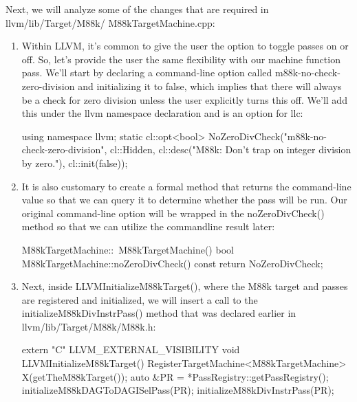 
Next, we will analyze some of the changes that are required in llvm/lib/Target/M88k/ M88kTargetMachine.cpp:

\begin{enumerate}
\item
Within LLVM, it’s common to give the user the option to toggle passes on or off. So, let’s provide the user the same flexibility with our machine function pass. We’ll start by declaring a command-line option called m88k-no-check-zero-division and initializing it to false, which implies that there will always be a check for zero division unless the user explicitly turns this off. We’ll add this under the llvm namespace declaration and is an option for llc:

\begin{cpp}
using namespace llvm;
static cl::opt<bool>
    NoZeroDivCheck("m88k-no-check-zero-division", cl::Hidden,
                    cl::desc("M88k: Don't trap on integer division by zero."),
                    cl::init(false));
\end{cpp}

\item
It is also customary to create a formal method that returns the command-line value so that we can query it to determine whether the pass will be run. Our original command-line option will be wrapped in the noZeroDivCheck() method so that we can utilize the commandline result later:

\begin{cpp}
M88kTargetMachine::~M88kTargetMachine() {}
bool M88kTargetMachine::noZeroDivCheck() const { return NoZeroDivCheck; }
\end{cpp}

\item
Next, inside LLVMInitializeM88kTarget(), where the M88k target and passes are registered and initialized, we will insert a call to the initializeM88kDivInstrPass() method that was declared earlier in llvm/lib/Target/M88k/M88k.h:

\begin{cpp}
extern "C" LLVM_EXTERNAL_VISIBILITY void
LLVMInitializeM88kTarget() {
    RegisterTargetMachine<M88kTargetMachine> X(getTheM88kTarget());
    auto &PR = *PassRegistry::getPassRegistry();
    initializeM88kDAGToDAGISelPass(PR);
    initializeM88kDivInstrPass(PR);
}
\end{cpp}


\end{enumerate}
